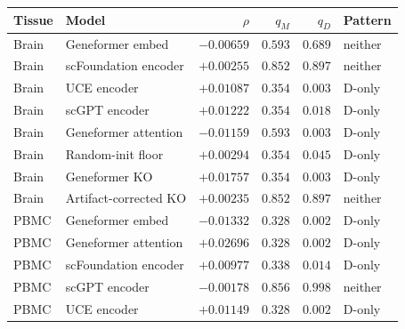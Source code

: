\begin{tabular}{llrrrl}
\toprule
Tissue & Model & $\rho$ & $q_M$ & $q_D$ & Pattern \\
\midrule
Brain & Geneformer embed & $-0.00659$ & $0.593$ & $0.689$ & neither \\
Brain & scFoundation encoder & $+0.00255$ & $0.852$ & $0.897$ & neither \\
Brain & UCE encoder & $+0.01087$ & $0.354$ & $0.003$ & D-only \\
Brain & scGPT encoder & $+0.01222$ & $0.354$ & $0.018$ & D-only \\
Brain & Geneformer attention & $-0.01159$ & $0.593$ & $0.003$ & D-only \\
Brain & Random-init floor & $+0.00294$ & $0.354$ & $0.045$ & D-only \\
Brain & Geneformer KO & $+0.01757$ & $0.354$ & $0.003$ & D-only \\
Brain & Artifact-corrected KO & $+0.00235$ & $0.852$ & $0.897$ & neither \\
PBMC & Geneformer embed & $-0.01332$ & $0.328$ & $0.002$ & D-only \\
PBMC & Geneformer attention & $+0.02696$ & $0.328$ & $0.002$ & D-only \\
PBMC & scFoundation encoder & $+0.00977$ & $0.338$ & $0.014$ & D-only \\
PBMC & scGPT encoder & $-0.00178$ & $0.856$ & $0.998$ & neither \\
PBMC & UCE encoder & $+0.01149$ & $0.328$ & $0.002$ & D-only \\
\bottomrule
\end{tabular}
